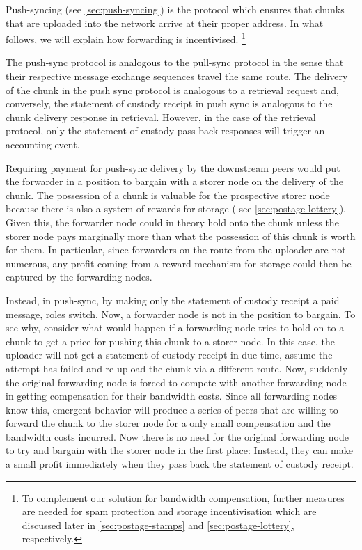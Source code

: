 Push-syncing (see \ref{sec:push-syncing}) is the protocol which ensures that chunks that are uploaded into the network arrive at their proper address. In what follows, we will explain how forwarding is incentivised.
%
%
\footnote{To complement our solution for bandwidth compensation, further measures are needed for spam protection and storage incentivisation which are discussed later in \ref{sec:postage-stamps} and \ref{sec:postage-lottery}, respectively.}

The push-sync protocol is analogous to the pull-sync protocol in the sense that their respective message exchange sequences travel the same route.
The delivery of the chunk in the push sync protocol is analogous to a retrieval request and, conversely, the statement of custody receipt in push sync is analogous to the chunk delivery response in retrieval. However, in the case of the retrieval protocol, only the statement of custody pass-back responses will trigger an accounting event.

Requiring payment for push-sync delivery by the downstream peers would put the forwarder in a position to bargain with a storer node on the delivery of the chunk. The possession of a chunk is valuable for the prospective storer node because there is also a system of rewards for storage ( see \ref{sec:postage-lottery}). Given this, the forwarder node could in theory hold onto the chunk unless the storer node pays marginally more than what the possession of this chunk is worth for them. In particular, since forwarders on the route from the uploader are not numerous, any profit coming from a reward mechanism for storage could then be captured by the forwarding nodes.

Instead, in push-sync, by making only the statement of custody receipt a paid message, roles switch. Now, a forwarder node is not in the position to bargain. To see why, consider what would happen if a forwarding node tries to hold on to a chunk to get a price for pushing this chunk to a storer node. In this case, the uploader will not get a statement of custody receipt in due time, assume the attempt has failed and re-upload the chunk via a different route. Now, suddenly the original forwarding node is forced to compete with another forwarding node in getting compensation for their bandwidth costs. Since all forwarding nodes know this, emergent behavior will produce a series of peers that are willing to forward the chunk to the storer node for a only small compensation and the bandwidth costs incurred. Now there is no need for the original forwarding node to try and bargain with the storer node in the first place: Instead, they can make a small profit immediately when they pass back the statement of custody receipt.


